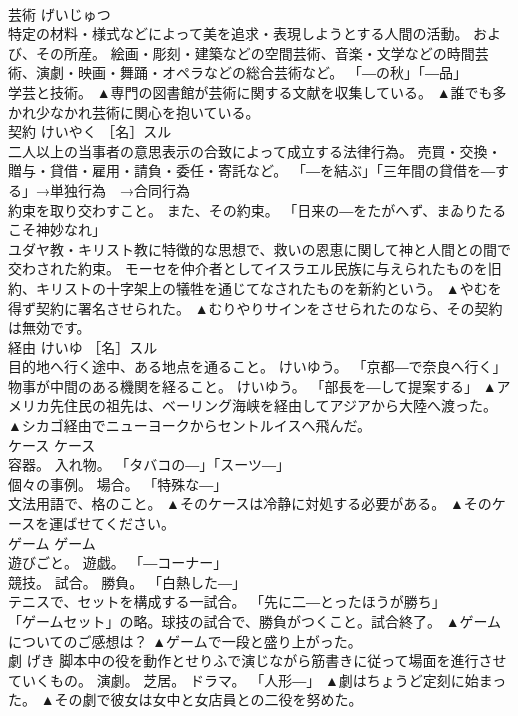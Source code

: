 \documentclass[8pt]{extreport}
\begin{document}
\begin{CJK}{UTF8}{min}
\\	芸術	げいじゅつ	
\\	特定の材料・様式などによって美を追求・表現しようとする人間の活動。 および、その所産。 絵画・彫刻・建築などの空間芸術、音楽・文学などの時間芸術、演劇・映画・舞踊・オペラなどの総合芸術など。 「―の秋」「―品」 
\\	学芸と技術。	▲専門の図書館が芸術に関する文献を収集している。 ▲誰でも多かれ少なかれ芸術に関心を抱いている。
\\	契約	けいやく	［名］スル 
\\	二人以上の当事者の意思表示の合致によって成立する法律行為。 売買・交換・贈与・貸借・雇用・請負・委任・寄託など。 「―を結ぶ」「三年間の貸借を―する」→単独行為　→合同行為 
\\	約束を取り交わすこと。 また、その約束。 「日来の―をたがへず、まゐりたるこそ神妙なれ」 
\\	ユダヤ教・キリスト教に特徴的な思想で、救いの恩恵に関して神と人間との間で交わされた約束。 モーセを仲介者としてイスラエル民族に与えられたものを旧約、キリストの十字架上の犠牲を通じてなされたものを新約という。	▲やむを得ず契約に署名させられた。 ▲むりやりサインをさせられたのなら、その契約は無効です。
\\	経由	けいゆ	［名］スル 
\\	目的地へ行く途中、ある地点を通ること。 けいゆう。 「京都―で奈良へ行く」 
\\	物事が中間のある機関を経ること。 けいゆう。 「部長を―して提案する」	▲アメリカ先住民の祖先は、ベーリング海峡を経由してアジアから大陸へ渡った。 ▲シカゴ経由でニューヨークからセントルイスへ飛んだ。
\\	ケース	ケース	
\\	容器。 入れ物。 「タバコの―」「スーツ―」 
\\	個々の事例。 場合。 「特殊な―」 
\\	文法用語で、格のこと。	▲そのケースは冷静に対処する必要がある。 ▲そのケースを運ばせてください。
\\	ゲーム	ゲーム	
\\	遊びごと。 遊戯。 「―コーナー」 
\\	競技。 試合。 勝負。 「白熱した―」 
\\	テニスで、セットを構成する一試合。 「先に二―とったほうが勝ち」 
\\	「ゲームセット」の略。球技の試合で、勝負がつくこと。試合終了。	▲ゲームについてのご感想は？ ▲ゲームで一段と盛り上がった。
\\	劇	げき	脚本中の役を動作とせりふで演じながら筋書きに従って場面を進行させていくもの。 演劇。 芝居。 ドラマ。 「人形―」	▲劇はちょうど定刻に始まった。 ▲その劇で彼女は女中と女店員との二役を努めた。

\end{CJK}
\end{document}
